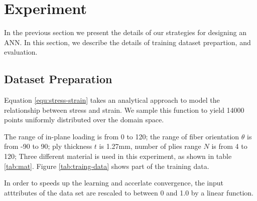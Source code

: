 \section{Experiment}
In the previous section we present the details of our strategies for designing an ANN. In
this section, we describe the details of training dataset prepartion, and evaluation.
\subsection{Dataset Preparation}
Equation \ref{equ:stress-strain} takes an analytical approach to model the
relationship between stress and strain. We sample this function to yield 14000 points
uniformly distributed over the domain space.

The range of in-plane loading is from 0 to 120; the range of fiber orientation $\theta$ is from
-90 to 90; ply thickness $t$ is 1.27mm, number of plies range $N$ is from 4 to 120;
Three different material is used in this experiment, as shown in table \ref{tab:mat}.
Figure \ref{tab:traing-data} shows part of the training data.

In order to speeds up the learning and accerlate convergence, the input
atttributes of the data set are rescaled to between 0 and 1.0 by a linear function.



